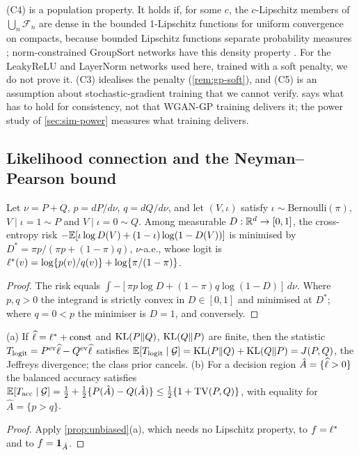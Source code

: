 \begin{remark}\label{rem:c-realism}
(C4) is a population property. It holds if, for some $c$, the $c$-Lipschitz members of
$\bigcup_n\mathcal F_n$ are dense in the bounded 1-Lipschitz functions for uniform convergence on
compacts, because bounded Lipschitz functions separate probability measures
\citep{dudley_2002_real}; norm-constrained GroupSort networks have this density property
\citep{anil_2019_sorting}. For the LeakyReLU and LayerNorm networks used here, trained with a soft
penalty, we do not prove it. (C3) idealises the penalty (\cref{rem:gp-soft}), and (C5) is an
assumption about stochastic-gradient training that we cannot verify.  says
what has to hold for consistency, not that WGAN-GP training delivers it; the power study of
\cref{sec:sim-power} measures what training delivers.
\end{remark}

\subsection{Likelihood connection and the Neyman--Pearson bound}\label{sec:theory-likelihood}

\begin{proposition}\label{prop:bayes-logit}
Let $\nu=P+Q$, $p=dP/d\nu$, $q=dQ/d\nu$, and let $(V,\iota)$ satisfy
$\iota\sim\mathrm{Bernoulli}(\pi)$, $V\mid\iota=1\sim P$ and $V\mid\iota=0\sim Q$. Among measurable
$D:\mathbb{R}^d\to[0,1]$, the cross-entropy risk $-\mathbb{E}[\iota\log D(V)+(1-\iota)\log(1-D(V))]$ is minimised
by $D^*=\pi p/(\pi p+(1-\pi)q)$, $\nu$-a.e., whose logit is
$\ell^{*}(v)=\log\{p(v)/q(v)\}+\log\{\pi/(1-\pi)\}$.
\end{proposition}
\begin{proof}
The risk equals $\int-[\pi p\log D+(1-\pi)q\log(1-D)]\,d\nu$. Where $p,q>0$ the integrand is
strictly convex in $D\in[0,1]$ and minimised at $D^*$; where $q=0<p$ the minimiser is $D=1$, and
conversely.
\end{proof}

\begin{corollary}\label{cor:jeffreys}
(a) If $\widehat{\ell}=\ell^{*}+\text{const}$ and $\operatorname{KL}(P\Vert Q)$, $\operatorname{KL}(Q\Vert P)$ are finite, then the
\LRC{} statistic $T_{\mathrm{logit}}=P^{\mathrm{ev}}\widehat{\ell}-Q^{\mathrm{ev}}\widehat{\ell}$ satisfies
$\mathbb{E}[T_{\mathrm{logit}}\mid\mathcal{G}]=\operatorname{KL}(P\Vert Q)+\operatorname{KL}(Q\Vert P)=J(P,Q)$, the Jeffreys divergence; the class
prior cancels. (b) For a decision region $\hat A=\{\widehat{\ell}>0\}$ the balanced accuracy satisfies
$\mathbb{E}[T_{\mathrm{acc}}\mid\mathcal{G}]=\tfrac12+\tfrac12\{P(\hat A)-Q(\hat A)\}\le\tfrac12\{1+\operatorname{TV}(P,Q)\}$, with
equality for $\hat A=\{p>q\}$.
\end{corollary}
\begin{proof}
Apply \cref{prop:unbiased}(a), which needs no Lipschitz property, to $f=\ell^{*}$ and to
$f=\mathbf{1}_{\hat A}$.
\end{proof}


